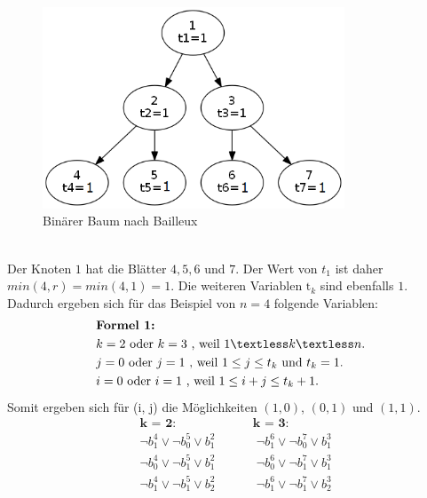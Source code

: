 \documentclass[a4,abstract=on]{scrartcl}
\begin{document}
\begin{figure}[H]
\centering
\includegraphics[width=9cm]{bailleux.png}
\caption{Binärer Baum nach Bailleux}
\label{fig:baum}
\end{figure}
\ \\
Der Knoten $1$ hat die Blätter $4,5,6$ und $7$. Der Wert von $t_1$ ist daher $min(4,r) = min(4,1) = 1$. Die weiteren Variablen $\text{t}_k$ sind ebenfalls $1$.
\ \\
Dadurch ergeben sich für das Beispiel von $n=4$ folgende Variablen:\\
\begin{align*}
&\textbf{Formel 1:}\\
&k=2 \text{ oder } k=3 \text{ , weil } 1 \textless k \textless n.\\
&j=0 \text{ oder } j=1 \text{ , weil } 1 \leq j \leq t_k \text{ und } t_k = 1.\\
&i=0 \text{ oder } i=1 \text{ , weil } 1\leq i+j \leq t_{k}+1.\\
\end{align*}
Somit ergeben sich für (i, j) die Möglichkeiten $(1,0)$, $(0,1)$ und $(1,1)$.\\
\begin{align*}
&\textbf{k = 2:} {~~~~~~~~~~~~~~~~~~~~~~~~~~~~} \textbf{k = 3:}\\
&\neg b_1^4 \vee \neg b_0^5 \vee b_1^2 {~~~~~~~~~~~~~~~} \neg b_1^6 \vee \neg b_0^7 \vee b_1^3\\
&\neg b_0^4 \vee \neg b_1^5 \vee b_1^2 {~~~~~~~~~~~~~~~} \neg b_0^6 \vee \neg b_1^7 \vee b_1^3\\
&\neg b_1^4 \vee \neg b_1^5 \vee b_2^2 {~~~~~~~~~~~~~~~} \neg b_1^6 \vee \neg b_1^7 \vee b_2^3\\
\end{align*}
\end{document}
